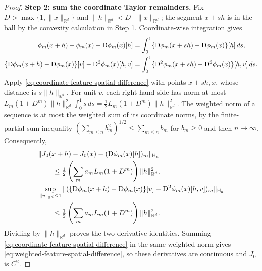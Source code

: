 \begin{proof}
\par\noindent\textbf{Step 2: sum the coordinate Taylor remainders.}
Fix $D>\max\{1,\|x\|_{\mathbb R^d}\}$ and $\|h\|_{\mathbb R^d}<D-\|x\|_{\mathbb R^d}$; the segment $x+sh$
is in the ball by the convexity calculation in Step 1.
Coordinate-wise integration gives
\[
\begin{aligned}
 \phi_m(x+h)-\phi_m(x)-\mathrm{D}\phi_m(x)[h]
 &=\int_0^1\{\mathrm{D}\phi_m(x+sh)-\mathrm{D}\phi_m(x)\}[h]\,ds,\\
 \{\mathrm{D}\phi_m(x+h)-\mathrm{D}\phi_m(x)\}[v]-\mathrm{D}^2\phi_m(x)[h,v]
 &=\int_0^1\{\mathrm{D}^2\phi_m(x+sh)-\mathrm{D}^2\phi_m(x)\}[h,v]\,ds.
\end{aligned}
\]
Apply \eqref{eq:coordinate-feature-spatial-difference} with points $x+sh,x$,
whose distance is $s\|h\|_{\mathbb R^d}$. For unit $v$, each right-hand side has norm
at most $L_m(1+D^m)\|h\|_{\mathbb R^d}^2\int_0^1s\,ds
=\tfrac12 L_m(1+D^m)\|h\|_{\mathbb R^d}^2$.
The weighted norm of a sequence is at most the weighted sum of its
coordinate norms, by the finite-partial-sum inequality
$(\sum_{m\le n}b_m^2)^{1/2}\le\sum_{m\le n}b_m$ for $b_m\ge0$
and then $n\to\infty$. Consequently,
\[
\begin{aligned}
 &\|J_0(x+h)-J_0(x)-(\mathrm{D}\phi_m(x)[h])_m\|_{\mathsf H_a}\\
 &\qquad\le\tfrac12\left(\sum_m a_mL_m(1+D^m)\right)\|h\|_{\mathbb R^d}^2,\\
 &\sup_{\|v\|_{\mathbb R^d}\le1}
 \|(\{\mathrm{D}\phi_m(x+h)-\mathrm{D}\phi_m(x)\}[v]-\mathrm{D}^2\phi_m(x)[h,v])_m\|_{\mathsf H_a}\\
 &\qquad\le\tfrac12\left(\sum_m a_mL_m(1+D^m)\right)\|h\|_{\mathbb R^d}^2.
\end{aligned}
\]
Dividing by $\|h\|_{\mathbb R^d}$ proves the two derivative identities. Summing
\eqref{eq:coordinate-feature-spatial-difference} in the same weighted
norm gives \eqref{eq:weighted-feature-spatial-difference}, so these
derivatives are continuous and $J_0$ is $C^2$.
\end{proof}

